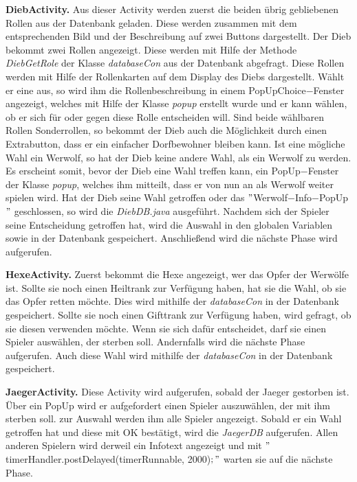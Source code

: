 \documentclass[12pt, a4paper]{article}
\begin{document}
\textbf{DiebActivity.}
Aus dieser Activity werden zuerst die beiden übrig gebliebenen Rollen aus der Datenbank geladen. Diese werden zusammen mit dem entsprechenden Bild und der Beschreibung auf zwei Buttons dargestellt.
Der Dieb bekommt zwei Rollen angezeigt. Diese werden mit Hilfe der Methode \textit{DiebGetRole} der Klasse \textit{databaseCon} aus der Datenbank abgefragt. Diese Rollen werden mit Hilfe der Rollenkarten auf dem Display des Diebs dargestellt. Wählt er eine aus, so wird ihm die Rollenbeschreibung in einem PopUpChoice$-$Fenster angezeigt, welches mit Hilfe der Klasse \textit{popup} erstellt wurde und er kann wählen, ob er sich für oder gegen diese Rolle entscheiden will. 
Sind beide wählbaren Rollen Sonderrollen, so bekommt der Dieb auch die Möglichkeit durch einen Extrabutton, dass er ein einfacher Dorfbewohner bleiben kann. Ist eine mögliche Wahl ein Werwolf, so hat der Dieb keine andere Wahl, als ein Werwolf zu werden. Es erscheint somit, bevor der Dieb eine Wahl treffen kann, ein PopUp$-$Fenster der Klasse \textit{popup}, welches ihm mitteilt, dass er von nun an als Werwolf weiter spielen wird. Hat der Dieb seine Wahl getroffen oder das $"$Werwolf$-$Info$-$PopUp$"$ geschlossen, so wird die \textit{DiebDB.java} ausgeführt. 
Nachdem sich der Spieler seine Entscheidung getroffen hat, wird die Auswahl in den globalen Variablen sowie in der Datenbank gespeichert. Anschließend wird die nächste Phase wird aufgerufen.

\vspace{0,3 cm}
      
\textbf{HexeActivity.}
Zuerst bekommt die Hexe angezeigt, wer das Opfer der Werwölfe ist.
Sollte sie noch einen Heiltrank zur Verfügung haben, hat sie die Wahl, ob sie das Opfer retten möchte. 
Dies wird mithilfe der \textit{databaseCon} in der Datenbank gespeichert.
Sollte sie noch einen Gifttrank zur Verfügung haben, wird gefragt, ob sie diesen verwenden möchte.
Wenn sie sich dafür entscheidet, darf sie einen Spieler auswählen, der sterben soll.
Andernfalls wird die nächste Phase aufgerufen.
Auch diese Wahl wird mithilfe der \textit{databaseCon} in der Datenbank gespeichert.
      
\vspace{0,3 cm}      
      
\textbf{JaegerActivity.}
Diese Activity wird aufgerufen, sobald der Jaeger gestorben ist. Über ein PopUp wird er aufgefordert einen Spieler auszuwählen, der mit ihm sterben soll. zur Auswahl werden ihm alle Spieler angezeigt. Sobald er ein Wahl getroffen hat und diese mit OK bestätigt, wird die \textit{JaegerDB} aufgerufen.
Allen anderen Spielern wird derweil ein Infotext angezeigt und mit $"$timerHandler.postDelayed(timerRunnable, 2000)$;"$ warten sie auf die nächste Phase.
    
\end{document}

